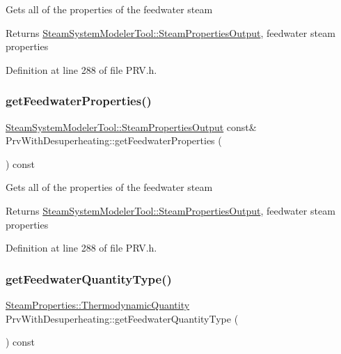 Gets all of the properties of the feedwater steam \begin{DoxyReturn}{Returns}
\hyperlink{struct_steam_system_modeler_tool_1_1_steam_properties_output}{Steam\+System\+Modeler\+Tool\+::\+Steam\+Properties\+Output}, feedwater steam properties 
\end{DoxyReturn}


Definition at line 288 of file P\+R\+V.\+h.

\mbox{\label{class_prv_with_desuperheating_a8f4594109bda9bc4030c23cee9841fa8}} 
\subsubsection{\texorpdfstring{get\+Feedwater\+Properties()}{getFeedwaterProperties()}\hspace{0.1cm}{\footnotesize\ttfamily [3/3]}}
{\footnotesize\ttfamily \hyperlink{struct_steam_system_modeler_tool_1_1_steam_properties_output}{Steam\+System\+Modeler\+Tool\+::\+Steam\+Properties\+Output} const\& Prv\+With\+Desuperheating\+::get\+Feedwater\+Properties (\begin{DoxyParamCaption}{ }\end{DoxyParamCaption}) const\hspace{0.3cm}{\ttfamily [inline]}}

Gets all of the properties of the feedwater steam \begin{DoxyReturn}{Returns}
\hyperlink{struct_steam_system_modeler_tool_1_1_steam_properties_output}{Steam\+System\+Modeler\+Tool\+::\+Steam\+Properties\+Output}, feedwater steam properties 
\end{DoxyReturn}


Definition at line 288 of file P\+R\+V.\+h.

\mbox{\label{class_prv_with_desuperheating_aa6901e00ecf819d95f79c20ef1775876}} 
\subsubsection{\texorpdfstring{get\+Feedwater\+Quantity\+Type()}{getFeedwaterQuantityType()}\hspace{0.1cm}{\footnotesize\ttfamily [1/3]}}
{\footnotesize\ttfamily \hyperlink{class_steam_properties_ae0294bedf7d178c2d8fb6aed0f62fbff}{Steam\+Properties\+::\+Thermodynamic\+Quantity} Prv\+With\+Desuperheating\+::get\+Feedwater\+Quantity\+Type (\begin{DoxyParamCaption}{ }\end{DoxyParamCaption}) const\hspace{0.3cm}{\ttfamily [inline]}}

